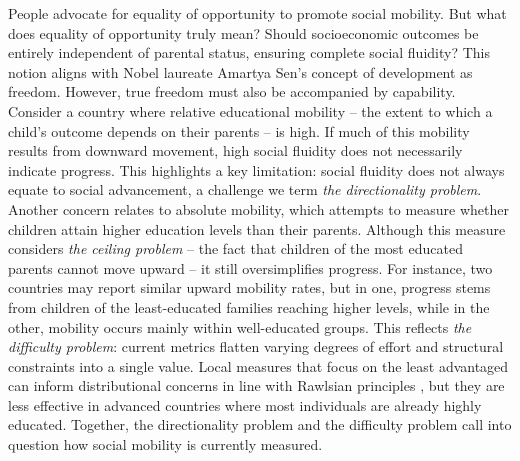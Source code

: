 People advocate for equality of opportunity to promote social mobility. But what does equality of opportunity truly mean? Should socioeconomic outcomes be entirely independent of parental status, ensuring complete social fluidity? This notion aligns with Nobel laureate Amartya Sen’s concept of development as freedom\nocite{sen2000development}. However, true freedom must also be accompanied by capability. Consider a country where relative educational mobility -- the extent to which a child's outcome depends on their parents -- is high. If much of this mobility results from downward movement, high social fluidity does not necessarily indicate progress. This highlights a key limitation: social fluidity does not always equate to social advancement, a challenge we term \textit{the directionality problem}. Another concern relates to absolute mobility, which attempts to measure whether children attain higher education levels than their parents. Although this measure considers \textit{the ceiling problem} -- the fact that children of the most educated parents cannot move upward -- it still oversimplifies progress. For instance, two countries may report similar upward mobility rates, but in one, progress stems from children of the least-educated families reaching higher levels, while in the other, mobility occurs mainly within well-educated groups. This reflects \textit{the difficulty problem}: current metrics flatten varying degrees of effort and structural constraints into a single value. Local measures that focus on the least advantaged can inform distributional concerns in line with Rawlsian principles \citep{Rawls1971}, but they are less effective in advanced countries where most individuals are already highly educated. Together, the directionality problem and the difficulty problem call into question how social mobility is currently measured.


